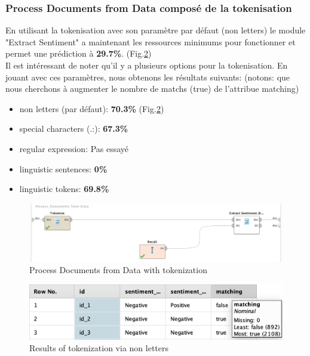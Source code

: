 \documentclass[a4paper]{article}
\begin{document}
\subsubsection{Process Documents from Data composé de la tokenisation}
En utilisant la tokenisation avec son paramètre par défaut (non letters) le module "Extract Sentiment" a maintenant les ressources minimums pour fonctionner et permet une prédiction à \textbf{29.7\%}. (Fig.\ref{fig:3_processing_documents_no_stem_filter_token_stopword_transform_results})
\\
Il est intéressant de noter qu'il y a plusieurs options pour la tokenisation. En jouant avec ces paramètres, nous obtenons les résultats suivants: (notons: que nous cherchons à augmenter le nombre de matchs (true) de l'attribue matching)
\begin{itemize}
	\item non letters (par défaut): \textbf{70.3\%} (Fig.\ref{fig:3_processing_documents_no_stem_filter_token_stopword_transform_results})
	\item special characters (.:): \textbf{67.3\%}
	\item regular expression: Pas essayé
	\item linguistic sentences: \textbf{0\%}
	\item linguistic tokens: \textbf{69.8\%}
\end{itemize}
\vspace{6pt}

\begin{figure}[H]
	\includegraphics[width=\linewidth]{imgs/part_3/3_processing_documents_no_stem_filter_token_stopword_transform}
	\caption{Process Documents from Data with tokenization}
	\label{fig:3_processing_documents_no_stem_filter_token_stopword_transform}
\end{figure}
\begin{figure}[H]
	\includegraphics[width=\linewidth]{imgs/part_3/3_processing_documents_no_stem_filter_token_stopword_transform_results}
	\caption{Results of tokenization via non letters}
	\label{fig:3_processing_documents_no_stem_filter_token_stopword_transform_results}
\end{figure}
\end{document}
